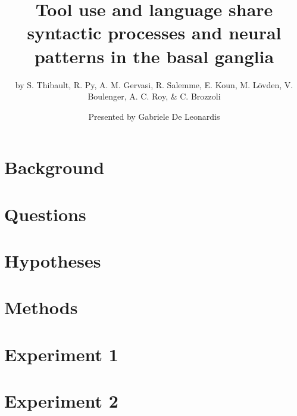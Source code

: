 \documentclass[11pt]{beamer}
\title{{Tool use and language share syntactic processes and neural patterns in the basal ganglia}}
\subtitle{\small{\vspace*{0.2cm}by S. Thibault, R. Py, A. M. Gervasi, R. Salemme, E. Koun, M. Lövden, V. Boulenger, A. C. Roy, \& C. Brozzoli}}
\author{\vspace*{-0.4cm}Presented by Gabriele De Leonardis}
\date{}
\begin{document}
\begin{frame}[noframenumbering]
    \maketitle
\end{frame}

\section{Background}



%

%

%

%

%

\section{Questions}



\section{Hypotheses}



\section{Methods}



\section{Experiment 1}















\section{Experiment 2}
\end{document}
